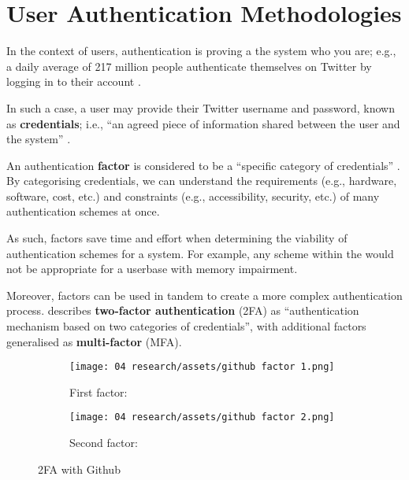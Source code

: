 \section{User Authentication Methodologies}
\label{s:authAuth}

In the context of users, \gls{authentication} is proving a
the system who you are; e.g., a daily average of 217
million people authenticate themselves on Twitter by
logging in to their account \parencite[][Q4]{twitterUsage}.

In such a case, a user may provide their Twitter username
and password, known as \textbf{credentials}; i.e.,
\enquote{an agreed piece of information shared between the
  user and the system} \parencite{whatIsAuth}.

An authentication \textbf{factor} is considered to be a
\enquote{specific category of credentials}
\parencite{whatIsAuth}.
By categorising credentials, we can understand the
requirements (e.g., hardware, software, cost, etc.) and
constraints (e.g., accessibility, security, etc.) of many
authentication schemes at once.

As such, factors save time and effort when determining the
viability of authentication schemes for a system.
For example, any scheme within the
 would not be
appropriate for a userbase with memory impairment.

Moreover, factors can be used in tandem to create a more
complex authentication process.
\cite{whatIsAuth}
describes \textbf{two-factor authentication} (2FA) as
\enquote{authentication mechanism based on two categories
  of credentials}, with additional factors generalised as
\textbf{multi-factor} (MFA).

\begin{figure}[H]
  \centering
  \begin{subfigure}{\subfigwidth}
    \centering
    \texttt{[image: 04
      research/assets/github factor 1.png]}
    \caption{First factor:
      }
  \end{subfigure}
  \begin{subfigure}{\subfigwidth}
    \centering
    \texttt{[image: 04
      research/assets/github factor 2.png]}
    \caption{Second factor: }

  \end{subfigure}

  \caption{2FA with Github}
\end{figure}

